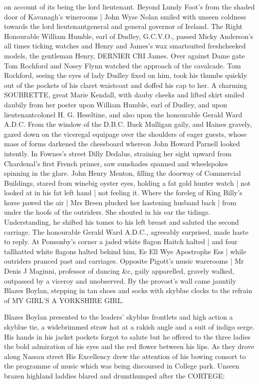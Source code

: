 on account of its being the lord lieutenant.
Beyond Lundy Foot's
from the shaded door of Kavanagh's winerooms |
John Wyse Nolan smiled with unseen coldness
towards the lord
lieutenantgeneral and general governor of Ireland.
The Right Honourable
William Humble,
earl of Dudley,
G.C.V.O.,
passed Micky Anderson's
all times ticking watches
and Henry and James's wax smartsuited
freshcheeked models,
the gentleman Henry,
DERNIER CRI James.
Over against Dame gate
Tom Rochford and Nosey Flynn
watched the approach of the cavalcade.
Tom Rochford,
seeing the eyes of lady Dudley fixed on him,
took his thumbs quickly
out of the pockets of his claret waistcoat and
doffed his cap to her.
A charming SOUBRETTE, great Marie Kendall,
with dauby cheeks and lifted skirt
smiled daubily from her poster
upon William Humble, earl of Dudley,
and upon lieutenantcolonel H. G. Heseltine,
and also upon the honourable Gerald Ward A.D.C.
From the window of the D.B.C.
Buck Mulligan gaily,
and Haines gravely,
gazed down on the
viceregal equipage
over the shoulders of eager guests,
whose mass of forms
darkened the chessboard
whereon John Howard Parnell looked intently.
In
Fownes's street
Dilly Dedalus,
straining her sight upward from
Chardenal's first French primer,
saw sunshades spanned and wheelspokes
spinning in the glare.
John Henry Menton,
filling the doorway of Commercial Buildings,
stared from winebig oyster eyes,
holding a fat gold hunter watch |
not looked at in his fat left hand |
not feeling it.
Where the foreleg of King Billy's horse pawed the air |
Mrs Breen plucked her hastening husband back |
from under the hoofs of the outriders.
She shouted in his ear
the tidings.
Understanding, he shifted his tomes to his left
breast
and saluted the second carriage.
The honourable Gerald Ward A.D.C.,
agreeably surprised,
made haste to reply.
At Ponsonby's corner
a jaded
white flagon Haitch \stage{[H.]} halted |
and four tallhatted white flagons halted behind him,
Ee Ell Wye Apostrophe Ess \stage{[E.L.Y.'S]} |
while outriders pranced past
and carriages.
Opposite Pigott's music warerooms |
Mr Denis J Maginni,
professor of dancing \&c,
gaily apparelled,
gravely walked,
outpassed by a viceroy and unobserved.
By the provost's wall
came jauntily Blazes Boylan,
stepping in tan shoes
and socks with skyblue clocks
to the refrain of
MY GIRL'S A YORKSHIRE GIRL.

Blazes Boylan presented to the leaders'
skyblue frontlets and high
action a skyblue tie,
a widebrimmed straw hat at a rakish angle
and a suit
of indigo serge.
His hands in his jacket pockets
forgot to salute but he
offered to the three ladies
the bold admiration of his eyes
and the red
flower between his lips.
As they drove along Nassau street
His Excellency
drew the attention of his bowing consort
to the programme of music
which
was being discoursed in College park.
Unseen brazen highland laddies
blared and drumthumped
after the CORTEGE:%


